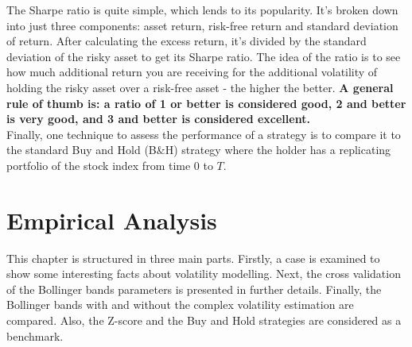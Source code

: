 \documentclass[11pt,a4,twosided,singlespacing,titlepagenumber=on]{scrreprt}
\numberwithin{equation}{chapter} %
\theoremstyle{remark}
\begin{document}
The Sharpe ratio is quite simple, which lends to its popularity. It's broken down into just three components: asset return, risk-free return and standard deviation of return. After calculating the excess return, it's divided by the standard deviation of the risky asset to get its Sharpe ratio. The idea of the ratio is to see how much additional return you are receiving for the additional volatility of holding the risky asset over a risk-free asset - the higher the better. \textbf{A general rule of thumb is: a ratio of 1 or better is considered good, 2 and better is very good, and 3 and better is considered excellent.} \\

Finally, one technique to assess the performance of a strategy is to compare it to the standard Buy and Hold (B\&H) strategy where the holder has a replicating portfolio of the stock index from time 0 to $T$.

\chapter{Empirical Analysis}
This chapter is structured in three main parts. Firstly, a case is examined to show some interesting facts about volatility modelling. Next, the cross validation of the Bollinger bands parameters is presented in further details. Finally, the Bollinger bands with and without the complex volatility estimation are compared. Also, the Z-score and the Buy and Hold strategies are considered as a benchmark.
\end{document}
